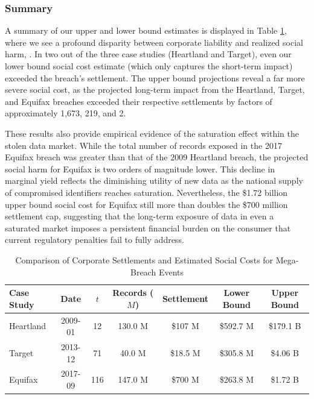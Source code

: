 \subsubsection{Summary}
A summary of our upper and lower bound estimates is displayed in Table \ref{tab:case_study_summary}, where we see a profound disparity between corporate liability and realized social harm, . In two out of the three case studies (Heartland and Target), even our lower bound social cost estimate (which only captures the short-term impact) exceeded the breach's settlement. The upper bound projections reveal a far more severe social cost, as the projected long-term impact from the Heartland, Target, and Equifax breaches exceeded their respective settlements by factors of approximately 1,673, 219, and 2.

These results also provide empirical evidence of the saturation effect within the stolen data market. While the total number of records exposed in the 2017 Equifax breach was greater than that of the 2009 Heartland breach, the projected social harm for Equifax is two orders of magnitude lower. This decline in marginal yield reflects the diminishing utility of new data as the national supply of compromised identifiers reaches saturation. Nevertheless, the \$1.72 billion upper bound social cost for Equifax still more than doubles the \$700 million settlement cap, suggesting that the long-term exposure of data in even a saturated market imposes a persistent financial burden on the consumer that current regulatory penalties fail to fully address.


\begin{table}[h]
\centering
\caption{Comparison of Corporate Settlements and Estimated Social Costs for Mega-Breach Events}
\label{tab:case_study_summary}
\begin{tabular}{lcccccc}
\hline
\textbf{Case Study} & \textbf{Date} & \textbf{$t$} & \textbf{Records ($M$)} & \textbf{Settlement} & \textbf{Lower Bound} & \textbf{Upper Bound} \\ \hline
Heartland & 2009-01 & 12 & 130.0 M& \$107 M & \$592.7 M & \$179.1 B \\
Target & 2013-12 & 71 & 40.0 M& \$18.5 M & \$305.8 M & \$4.06 B \\
Equifax & 2017-09 & 116 & 147.0 M& \$700 M & \$263.8 M & \$1.72 B \\ \hline
\end{tabular}
\end{table}